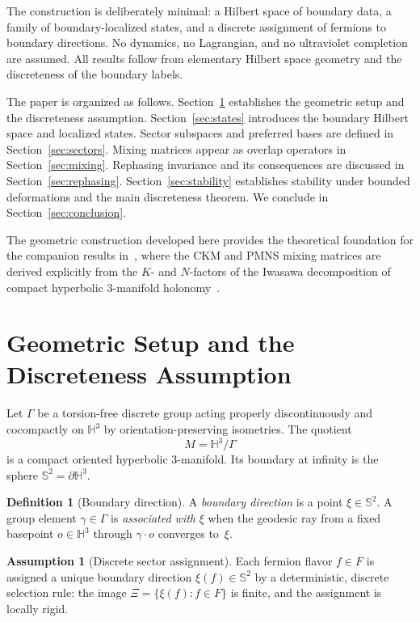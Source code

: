 \documentclass[12pt]{article}
\theoremstyle{definition}
\newtheorem{definition}[theorem]{Definition}
\newtheorem{assumption}[theorem]{Assumption}
\theoremstyle{remark}
\newcommand{\Hthree}{\mathbb{H}^3}
\newcommand{\Sphere}{\mathbb{S}^2}
\newcommand{\GammaG}{\Gamma}
\newcommand{\bdry}{\partial\mathbb{H}^3}
\begin{document}
The construction is deliberately minimal: a Hilbert space of boundary data,
a family of boundary-localized states, and a discrete assignment of fermions
to boundary directions.  No dynamics, no Lagrangian, and no ultraviolet
completion are assumed.  All results follow from elementary Hilbert space
geometry and the discreteness of the boundary labels.

The paper is organized as follows.  Section~\ref{sec:geom} establishes
the geometric setup and the discreteness assumption.
Section~\ref{sec:states} introduces the boundary Hilbert space and
localized states.  Sector subspaces and preferred bases are defined in
Section~\ref{sec:sectors}.  Mixing matrices appear as overlap operators in
Section~\ref{sec:mixing}.  Rephasing invariance and its consequences are
discussed in Section~\ref{sec:rephasing}.  Section~\ref{sec:stability}
establishes stability under bounded deformations and the main discreteness
theorem.  We conclude in Section~\ref{sec:conclusion}.

The geometric construction developed here provides the theoretical
foundation for the companion results in~\cite{Gentry:CKM,Gentry:PMNS},
where the CKM and PMNS mixing matrices are derived explicitly from the
$K$- and $N$-factors of the Iwasawa decomposition of compact hyperbolic
3-manifold holonomy~\cite{Gentry:CKM,Gentry:PMNS}.

\section{Geometric Setup and the Discreteness Assumption}
\label{sec:geom}

Let $\GammaG$ be a torsion-free discrete group acting properly discontinuously
and cocompactly on $\Hthree$ by orientation-preserving isometries.
The quotient
\[
  M = \Hthree/\GammaG
\]
is a compact oriented hyperbolic $3$-manifold.
Its boundary at infinity is the sphere $\Sphere = \bdry$.

\begin{definition}[Boundary direction]\label{def:bdrydir}
A \emph{boundary direction} is a point $\xi\in\Sphere$.
A group element $\gamma\in\GammaG$ is \emph{associated with} $\xi$ when
the geodesic ray from a fixed basepoint $o\in\Hthree$ through $\gamma\cdot o$
converges to~$\xi$.
\end{definition}

\begin{assumption}[Discrete sector assignment]\label{ass:discrete}
Each fermion flavor $f\in F$ is assigned a unique boundary direction
$\xi(f)\in\Sphere$ by a deterministic, discrete selection rule:
the image $\Xi=\{\xi(f):f\in F\}$ is finite, and the assignment is
locally rigid.
\end{assumption}
\end{document}
